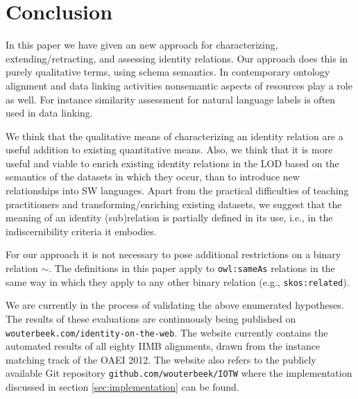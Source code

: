 \section{Conclusion}
\label{sec:conclusion}

In this paper we have given an new approach for characterizing,
  extending/retracting, and assessing identity relations.
Our approach does this in purely qualitative terms, using schema semantics.
In contemporary ontology alignment and data linking activities nonsemantic
  aspects of resources play a role as well.
For instance similarity assessment for natural language labels is often
  used in data linking.

We think that the qualitative means of characterizing an identity relation
  are a useful addition to existing quantitative means.
Also, we think that it is more useful and viable to enrich existing
  identity relations in the LOD based on the semantics of the datasets
  in which they occur, than to introduce new relationships into SW languages.
Apart from the practical difficulties of teaching practitioners
  and transforming/enriching existing datasets, we suggest that the
  meaning of an identity (sub)relation is partially defined in its use,
  i.e., in the indiscernibility criteria it embodies.

For our approach it is not necessary to pose additional restrictions
  on a binary relation $\sim$.
The definitions in this paper apply to \verb|owl:sameAs| relations
  in the same way in which they apply to any other binary relation
  (e.g., \verb|skos:related|).

We are currently in the process of validating the above enumerated hypotheses.
The results of these evaluations are continuously being published on
  \verb|wouterbeek.com/identity-on-the-web|.
The website currently contains the automated results of all eighty IIMB
  alignments, drawn from the instance matching track of the
  OAEI 2012.
The website also refers to the publicly available Git repository
  \verb|github.com/wouterbeek/IOTW| where the implementation
  discussed in section \ref{sec:implementation} can be found.
